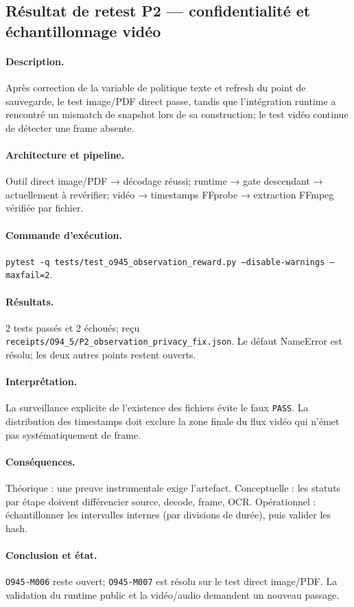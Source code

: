 \documentclass[11pt,a4paper]{article}
\begin{document}
\subsection{Résultat de retest P2 — confidentialité et échantillonnage vidéo}
\paragraph{Description.} Après correction de la variable de politique texte et refresh du point de sauvegarde, le test image/PDF direct passe, tandis que l'intégration runtime a rencontré un mismatch de snapshot lors de sa construction; le test vidéo continue de détecter une frame absente.
\paragraph{Architecture et pipeline.} Outil direct image/PDF → décodage réussi; runtime → gate descendant → actuellement à revérifier; vidéo → timestamps FFprobe → extraction FFmpeg vérifiée par fichier.
\paragraph{Commande d'exécution.} \texttt{pytest -q tests/test\_o945\_observation\_reward.py --disable-warnings --maxfail=2}.
\paragraph{Résultats.} 2 tests passés et 2 échoués; reçu \texttt{receipts/O94\_5/P2\_observation\_privacy\_fix.json}. Le défaut NameError est résolu; les deux autres points restent ouverts.
\paragraph{Interprétation.} La surveillance explicite de l'existence des fichiers évite le faux \texttt{PASS}. La distribution des timestamps doit exclure la zone finale du flux vidéo qui n'émet pas systématiquement de frame.
\paragraph{Conséquences.} Théorique : une preuve instrumentale exige l'artefact. Conceptuelle : les statuts par étape doivent différencier source, decode, frame, OCR. Opérationnel : échantillonner les intervalles internes (par divisions de durée), puis valider les hash.
\paragraph{Conclusion et état.} \texttt{O945-M006} reste ouvert; \texttt{O945-M007} est résolu sur le test direct image/PDF. La validation du runtime public et la vidéo/audio demandent un nouveau passage.
\end{document}
